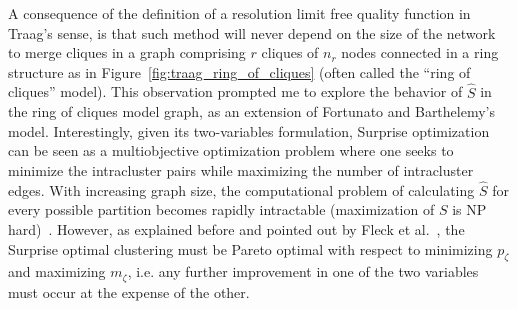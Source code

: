 A consequence of the definition of a resolution limit free quality function in Traag's sense, is that such method will never depend on the size of the network to merge cliques in a graph comprising $r$ cliques of $n_r$ nodes connected in a ring structure as in Figure~\ref{fig:traag_ring_of_cliques} (often called the ``ring of cliques'' model).
This observation prompted me to explore the behavior of $\hat{S}$ in the ring of cliques model graph, as an extension of Fortunato and Barthelemy's model.
Interestingly, given its two-variables formulation, Surprise optimization can be seen as a multiobjective optimization problem where one seeks to minimize the intracluster pairs while maximizing the number of intracluster edges.
With increasing graph size, the computational problem of calculating $\hat{S}$ for every possible partition becomes rapidly intractable (maximization of $S$ is NP hard)~\cite{fleck2014}.
However, as explained before and pointed out by Fleck et al.~\cite{fleck2014}, the Surprise optimal clustering must be Pareto optimal with respect to minimizing $p_\zeta$ and maximizing $m_\zeta$, i.e. any further improvement in one of the two variables must occur at the expense of the other.

